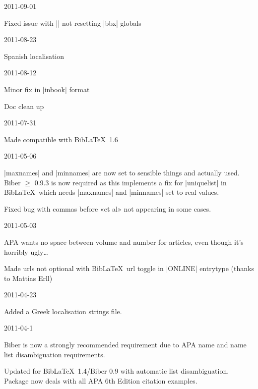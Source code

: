 \documentclass{ltxdockit}
\begin{document}
\begin{changelog}
\begin{release}{3.4}{2011-09-01}
\item Fixed issue with |\fullcite| not resetting |bbx| globals
\end{release}

\begin{release}{3.3}{2011-08-23}
\item Spanish localisation
\end{release}

\begin{release}{3.2}{2011-08-12}
\item Minor fix in |inbook| format
\item Doc clean up
\end{release}

\begin{release}{3.1}{2011-07-31}
\item Made compatible with Bib\LaTeX\ 1.6
\end{release}

\begin{release}{3.0}{2011-05-06}
\item |maxnames| and |minnames| are now set to sensible things and actually
  used. Biber $\geq$ 0.9.3 is now required as this implements a fix for
  |uniquelist| in Bib\LaTeX\ which needs |maxnames| and |minnames| set to
  real values.
\item Fixed bug with commas before «et al» not appearing in some cases.
\end{release}

\begin{release}{2.9}{2011-05-03}
\item APA wants no space between volume and number for articles, even though it's
  horribly ugly\ldots
\item Made urls not optional with Bib\LaTeX\ url toggle in |ONLINE| entrytype (thanks to Mattias Erll)
\end{release}

\begin{release}{2.8}{2011-04-23}
\item Added a Greek localisation strings file.
\end{release}

\begin{release}{2.7}{2011-04-1}
\item Biber is now a strongly recommended requirement due to APA name and
  name list disambiguation requirements.
\item Updated for Bib\LaTeX\ 1.4/Biber 0.9 with automatic list
  disambiguation. Package now deals with all APA 6th Edition citation examples.
\end{release}


\end{changelog}
\end{document}
